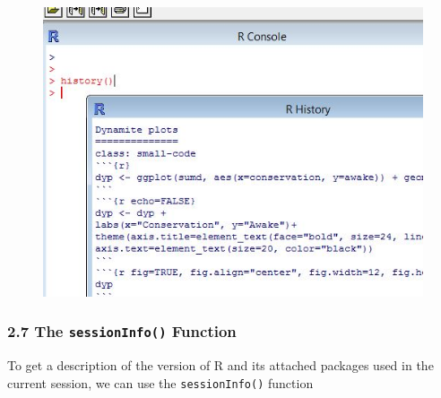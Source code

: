 \documentclass{beamer}
\begin{document}
 \begin{frame}
 	\begin{figure}
 		\centering
 		\includegraphics[width=0.7\linewidth]{images/Rhistory}        
 	\end{figure}
 \end{frame}   
 \begin{frame}
 	\frametitle{2.7 The \texttt{sessionInfo()} Function}
 	To get a description of the version of R and its attached packages used in the current session,
 	we can use the \texttt{sessionInfo()} function
 	
 \end{frame}
 
\end{document}
